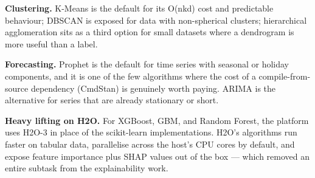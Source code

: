 \documentclass[12pt, a4paper, oneside]{report}
\begin{document}
\textbf{Clustering.} K-Means is the default for its O(nkd) cost and
predictable behaviour; DBSCAN is exposed for data with non-spherical
clusters; hierarchical agglomeration sits as a third option for
small datasets where a dendrogram is more useful than a label.

\textbf{Forecasting.} Prophet is the default for time series with
seasonal or holiday components, and it is one of the few algorithms
where the cost of a compile-from-source dependency (CmdStan) is
genuinely worth paying. ARIMA is the alternative for series that are
already stationary or short.

\textbf{Heavy lifting on H2O.} For XGBoost, GBM, and Random Forest,
the platform uses H2O-3 in place of the scikit-learn implementations.
H2O's algorithms run faster on tabular data, parallelise across the
host's CPU cores by default, and expose feature importance plus SHAP
values out of the box --- which removed an entire subtask from the
explainability work.
\end{document}
